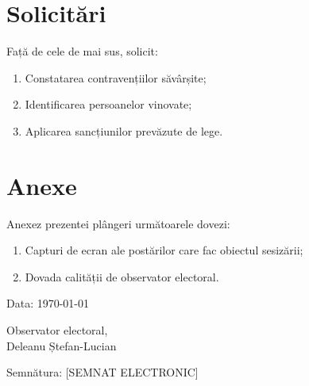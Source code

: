 \documentclass[a4paper,12pt]{article}
\begin{document}
\vspace{0.5cm}

\section{Solicitări}

Față de cele de mai sus, solicit:

\begin{enumerate}[leftmargin=*, label=\arabic*.]
    \item Constatarea contravențiilor săvârșite;
    \item Identificarea persoanelor vinovate;
    \item Aplicarea sancțiunilor prevăzute de lege.
\end{enumerate}

\section{Anexe}

Anexez prezentei plângeri următoarele dovezi:

\begin{enumerate}[leftmargin=*, label=\arabic*.]
    \item Capturi de ecran ale postărilor care fac obiectul sesizării;
    \item Dovada calității de observator electoral.
\end{enumerate}

\vspace{1cm}
\noindent Data: \today

\vspace{1.5cm}
\noindent Observator electoral,\\[0.3cm]
Deleanu Ștefan-Lucian

\vspace{1cm}
\noindent Semnătura: [SEMNAT ELECTRONIC]
\end{document}

